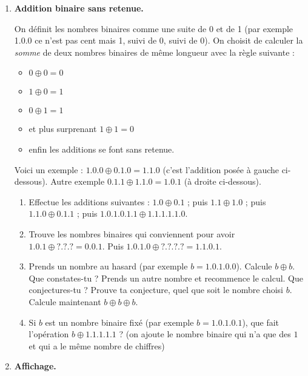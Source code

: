 \documentclass[class=report,crop=false, 12pt]{standalone}
\begin{document}
\begin{activite}
\sauteligne
\begin{enumerate}
  \item \textbf{Addition binaire sans retenue.}
  
On définit les nombres binaires comme une suite de 0 et de 1 (par exemple 1.0.0 ce n'est pas \og cent \fg{} mais 1, suivi de 0, suivi de 0). On choisit de calculer la \emph{somme} de deux nombres binaires de même longueur avec la règle suivante : 
\begin{itemize}
  \item $0 \oplus 0 = 0$
  \item $1 \oplus 0 = 1$
  \item $0 \oplus 1 = 1$
  \item et plus surprenant $1 \oplus 1 = 0$
  \item  enfin les additions se font sans retenue.
\end{itemize}

    Voici un exemple : $1.0.0 \oplus 0.1.0 = 1.1.0$ (c'est l'addition posée à gauche ci-dessous). Autre exemple $0.1.1 \oplus 1.1.0 = 1.0.1$ (à droite ci-dessous).



  
  \begin{enumerate}
    \item Effectue les additions suivantes : $1.0 \oplus 0.1$ ; puis $1.1 \oplus 1.0$ ; puis $1.1.0 \oplus 0.1.1$ ; puis $1.0.1.0.1.1 \oplus 1.1.1.1.1.0$.

    \item Trouve les nombres binaires qui conviennent pour avoir $1.0.1 \oplus ?.?.? = 0.0.1$. Puis $1.0.1.0 \oplus ?.?.?.? = 1.1.0.1$.
    
    \item  Prends un nombre au hasard (par exemple $b = 1.0.1.0.0$). Calcule $b \oplus b$. Que constates-tu ? Prends un autre nombre et recommence le calcul. Que conjectures-tu ? Prouve ta conjecture, quel que soit le nombre choisi $b$. Calcule maintenant $b \oplus b \oplus b$.
    
    \item Si $b$ est un nombre binaire fixé (par exemple $b = 1.0.1.0.1$), que fait l'opération $b \oplus 1.1.1.1.1$ ? (on ajoute le nombre binaire qui n'a que des $1$ et qui a le même nombre de chiffres)    
  \end{enumerate}  
  
  \item \textbf{Affichage.}
  

\end{enumerate}
\end{activite}
\end{document}
